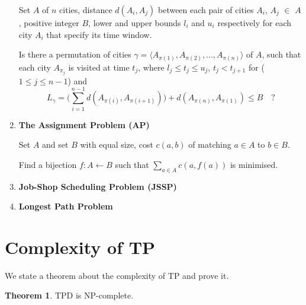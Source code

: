 \documentclass{mprop}
\theoremstyle{definition}
\newtheorem{theorem}{Theorem}
\begin{document}
\begin{enumerate}
\begin{instance}
Set $A$ of $n$ cities, distance $d(A_{i}, A_{j})$ between each pair of cities $A_{i}$, $A_{j}$ $\in$ $A$, positive integer $B$, lower and upper bounds $l_{i}$ and $u_{i}$ respectively for each city $A_{i}$ that specify its time window.
\end{instance}

\begin{question}
Is there a permutation of cities $\gamma = \langle A_{\pi(1)}, A_{\pi(2)},...,A_{\pi(n)} \rangle$ of $A$, such that each city $A_{\pi_{j}}$ is visited at time $t_{j}$, where $l_{j} \leq t_{j} \leq u_{j}$, $t_{j} < t_{j+1}$ for ($1 \leq j \leq n-1 $) and 
$$L_{\gamma} = \bigg( \sum_{i=1}^{n-1} d(A_{\pi(i)}, A_{\pi(i+1)}) \bigg) + d(A_{\pi(n)}, A_{\pi(1)}) \leq B \quad \textrm{?}$$

\end{question}

\item \textbf{The Assignment Problem (AP)}

\begin{instance}
Set $A$ and set $B$ with equal size, cost $c(a,b)$ of matching $a \in A$ to $b \in B$.
\end{instance}

\begin{question}
Find a bijection $f: A \gets B$ such that $\sum_{a\in A} c(a,f(a))$ is minimised.
\end{question}
\item \textbf{Job-Shop Scheduling Problem (JSSP)}
\item \textbf{Longest Path Problem}
\end{enumerate}

\section{Complexity of TP}
We state a theorem about the complexity of TP and prove it.
\begin{theorem}
TPD is NP-complete.
\end{theorem}
\end{document}
